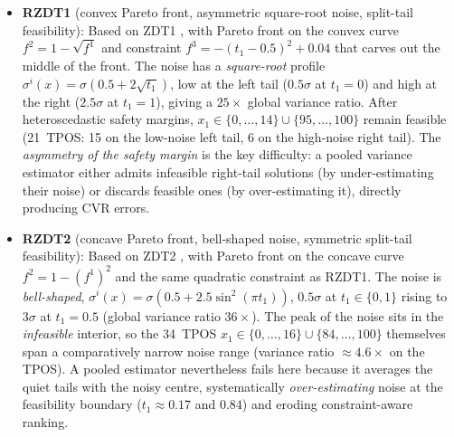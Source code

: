 \documentclass[12pt]{article}
\theoremstyle{plain}
\theoremstyle{definition}
\theoremstyle{remark}
\begin{document}
\begin{itemize}[leftmargin=2em]
  \item \textbf{RZDT1} (convex Pareto front, asymmetric square-root noise,
    split-tail feasibility):  Based on ZDT1 \citep{Zitzler2000}, with
    Pareto front on the convex curve $f^2=1-\sqrt{f^1}$ and constraint
    $f^3=-(t_1-0.5)^2+0.04$ that carves out the middle of the front.
    The noise has a \emph{square-root} profile
    $\sigma^i(x)=\sigma(0.5+2\sqrt{t_1})$, low at the left tail
    ($0.5\sigma$ at $t_1=0$) and high at the right ($2.5\sigma$ at
    $t_1=1$), giving a $25\times$ global variance ratio.  After
    heteroscedastic safety margins, $x_1\in\{0,\ldots,14\}\cup\{95,\ldots,100\}$
    remain feasible (21~TPOS: 15 on the low-noise left tail, 6 on the
    high-noise right tail).  The \emph{asymmetry of the safety margin}
    is the key difficulty: a pooled variance estimator either admits
    infeasible right-tail solutions (by under-estimating their noise) or
    discards feasible ones (by over-estimating it), directly producing
    CVR errors.

  \item \textbf{RZDT2} (concave Pareto front, bell-shaped noise,
    symmetric split-tail feasibility):  Based on ZDT2
    \citep{Zitzler2000}, with Pareto front on the concave curve
    $f^2=1-(f^1)^2$ and the same quadratic constraint as RZDT1.  The
    noise is \emph{bell-shaped},
    $\sigma^i(x)=\sigma(0.5+2.5\sin^2(\pi t_1))$, $0.5\sigma$ at
    $t_1\in\{0,1\}$ rising to $3\sigma$ at $t_1=0.5$ (global variance
    ratio $36\times$).  The peak of the noise sits in the \emph{infeasible}
    interior, so the 34~TPOS $x_1\in\{0,\ldots,16\}\cup\{84,\ldots,100\}$
    themselves span a comparatively narrow noise range (variance ratio
    ${\approx}4.6\times$ on the TPOS).  A pooled estimator nevertheless
    fails here because it averages the quiet tails with the noisy centre,
    systematically \emph{over-estimating} noise at the feasibility
    boundary ($t_1\approx0.17$ and $0.84$) and eroding constraint-aware
    ranking.


\end{itemize}
\end{document}
